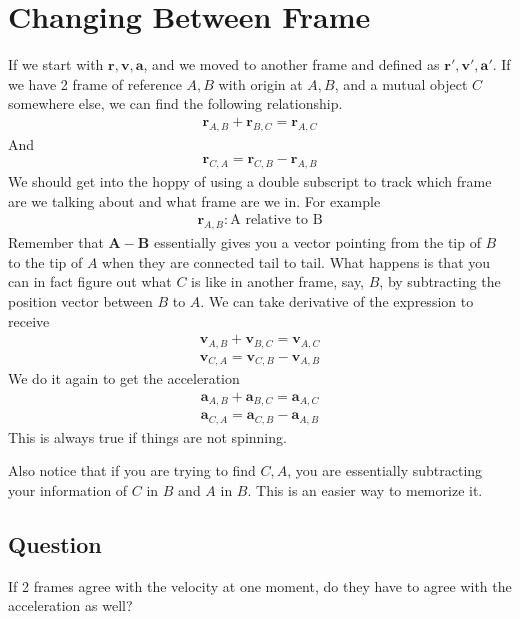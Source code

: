 \documentclass[12pt]{article}
\begin{document}
\section{Changing Between Frame}
If we start with $\mathbf{r},\mathbf{v},\mathbf{a}$, and we moved to another frame and defined as $\mathbf{r}',\mathbf{v}',\mathbf{a}'$. If we have 2 frame of reference $A,B$ with origin at $A,B$, and a mutual object $C$ somewhere else, we can find the following relationship.
\begin{align}
\mathbf{r}_{A,B} + \mathbf{r}_{B,C} = \mathbf{r}_{A,C}
\end{align}
And
\begin{align}
\mathbf{r}_{C,A} = \mathbf{r}_{C,B} - \mathbf{r}_{A,B}
\end{align}
We should get into the hoppy of using a double subscript to track which frame are we talking about and what frame are we in. For example
\begin{align}
\mathbf{r}_{A,B} \colon \text{A relative to B}
\end{align}
Remember that $\mathbf{A} - \mathbf{B}$ essentially gives you a vector pointing from the tip of $B$ to the tip of $A$ when they are connected tail to tail.
What happens is that you can in fact figure out what $C$ is like in another frame, say, $B$, by subtracting the position vector between $B$ to $A$. We can take derivative of the expression to receive
\begin{align*}
    \mathbf{v}_{A,B}+\mathbf{v}_{B,C}=\mathbf{v}_{A,C}\\
    \mathbf{v}_{C,A} = \mathbf{v}_{C,B} - \mathbf{v}_{A,B}
\end{align*}
We do it again to get the acceleration
\begin{align*}
    \mathbf{a}_{A,B}+\mathbf{a}_{B,C}=\mathbf{a}_{A,C}\\
    \mathbf{a}_{C,A} = \mathbf{a}_{C,B} - \mathbf{a}_{A,B}
\end{align*}
This is always true if things are not spinning.

Also notice that if you are trying to find $C,A$, you are essentially subtracting your information of $C$ in $B$ and $A$ in $B$. This is an easier way to memorize it. 

\subsection{Question}
If 2 frames agree with the velocity at one moment, do they have to agree with the acceleration as well?
\end{document}
